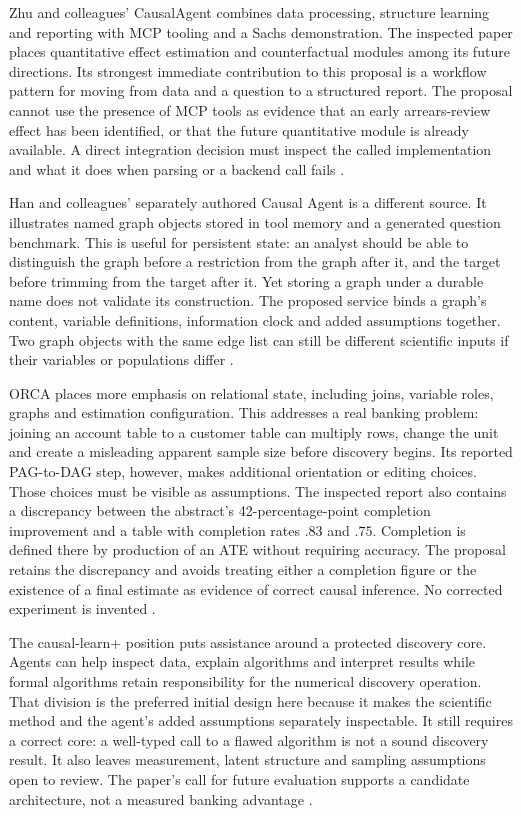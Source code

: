 Zhu and colleagues' CausalAgent combines data processing, structure learning and
reporting with MCP tooling and a Sachs demonstration. The inspected paper places
quantitative effect estimation and counterfactual modules among its future
directions. Its strongest immediate contribution to this proposal is a
workflow pattern for moving from data and a question to a structured report.
The proposal cannot use the presence of MCP tools as evidence that an early
arrears-review effect has been identified, or that the future quantitative
module is already available. A direct integration decision must inspect the
called implementation and what it does when parsing or a backend call fails
\citep{v12_la_2602_11527,exec13_data_causalagent_code}.

Han and colleagues' separately authored Causal Agent is a different source.
It illustrates named graph objects stored in tool memory and a generated
question benchmark. This is useful for persistent state: an analyst should be
able to distinguish the graph before a restriction from the graph after it,
and the target before trimming from the target after it. Yet storing a graph
under a durable name does not validate its construction. The proposed service
binds a graph's content, variable definitions, information clock and added
assumptions together. Two graph objects with the same edge list can still be
different scientific inputs if their variables or populations differ
\citep{exec13_census_causal_agent}.

ORCA places more emphasis on relational state, including joins, variable roles,
graphs and estimation configuration. This addresses a real banking problem:
joining an account table to a customer table can multiply rows, change the unit
and create a misleading apparent sample size before discovery begins. Its
reported PAG-to-DAG step, however, makes additional orientation or editing
choices. Those choices must be visible as assumptions. The inspected report
also contains a discrepancy between the abstract's 42-percentage-point
completion improvement and a table with completion rates $.83$ and $.75$.
Completion is defined there by production of an ATE without requiring accuracy.
The proposal retains the discrepancy and avoids treating either a completion
figure or the existence of a final estimate as evidence of correct causal
inference. No corrected experiment is invented
\citep{exec13_census_orca}.

The causal-learn+ position puts assistance around a protected discovery core.
Agents can help inspect data, explain algorithms and interpret results while
formal algorithms retain responsibility for the numerical discovery operation.
That division is the preferred initial design here because it makes the
scientific method and the agent's added assumptions separately inspectable.
It still requires a correct core: a well-typed call to a flawed algorithm is
not a sound discovery result. It also leaves measurement, latent structure and
sampling assumptions open to review. The paper's call for future evaluation
supports a candidate architecture, not a measured banking advantage
\citep{v12_la_2606_23608}.

